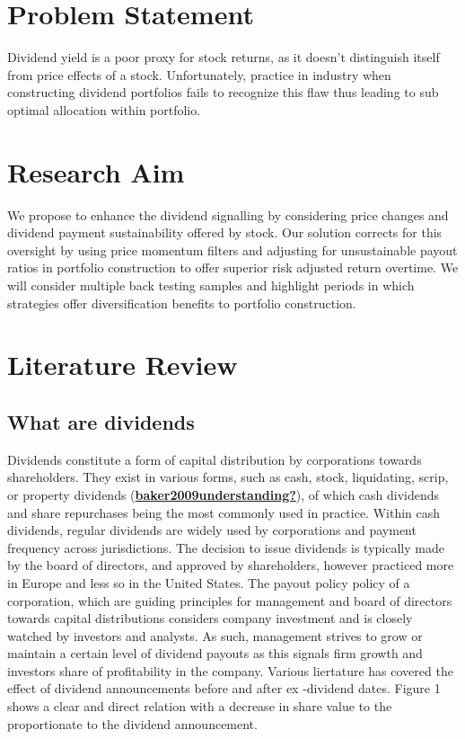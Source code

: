 \documentclass[11pt,preprint, authoryear]{elsarticle}
\numberwithin{equation}{section}
\numberwithin{figure}{section}
\numberwithin{table}{section}
\begin{document}
\hypertarget{problem-statement}{%
\section{Problem Statement}\label{problem-statement}}

Dividend yield is a poor proxy for stock returns, as it doesn't
distinguish itself from price effects of a stock. Unfortunately,
practice in industry when constructing dividend portfolios fails to
recognize this flaw thus leading to sub optimal allocation within
portfolio.

\hypertarget{research-aim}{%
\section{Research Aim}\label{research-aim}}

We propose to enhance the dividend signalling by considering price
changes and dividend payment sustainability offered by stock. Our
solution corrects for this oversight by using price momentum filters and
adjusting for unsustainable payout ratios in portfolio construction to
offer superior risk adjusted return overtime. We will consider multiple
back testing samples and highlight periods in which strategies offer
diversification benefits to portfolio construction.

\hypertarget{literature-review}{%
\section{Literature Review}\label{literature-review}}

\hypertarget{what-are-dividends}{%
\subsection{What are dividends}\label{what-are-dividends}}

Dividends constitute a form of capital distribution by corporations
towards shareholders. They exist in various forms, such as cash, stock,
liquidating, scrip, or property dividends
(\protect\hyperlink{ref-baker2009understanding}{\textbf{baker2009understanding?}}),
of which cash dividends and share repurchases being the most commonly
used in practice. Within cash dividends, regular dividends are widely
used by corporations and payment frequency across jurisdictions. The
decision to issue dividends is typically made by the board of directors,
and approved by shareholders, however practiced more in Europe and less
so in the United States. The payout policy policy of a corporation,
which are guiding principles for management and board of directors
towards capital distributions considers company investment and is
closely watched by investors and analysts. As such, management strives
to grow or maintain a certain level of dividend payouts as this signals
firm growth and investors share of profitability in the company. Various
liertature has covered the effect of dividend announcements before and
after ex -dividend dates. Figure 1 shows a clear and direct relation
with a decrease in share value to the proportionate to the dividend
announcement.
\end{document}
